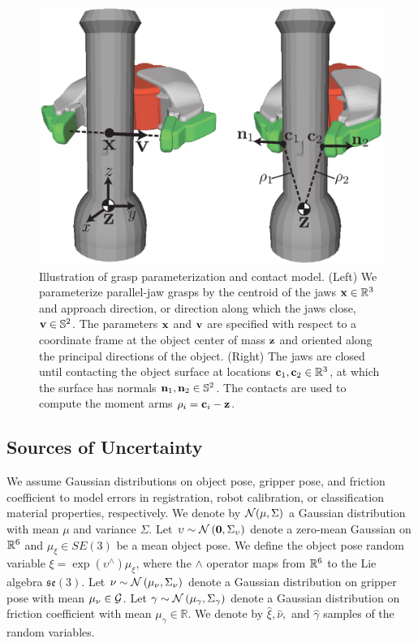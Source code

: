 \begin{figure}[t!]
\centering
\includegraphics[scale=0.44]{figures/illustrations/dexnet_grasping_model.eps}
\caption{Illustration of grasp parameterization and contact model. (Left) We parameterize parallel-jaw grasps by the centroid of the jaws $\mathbf{x} \in \mathbb{R}^3$ and approach direction, or direction along which the jaws close, $\mathbf{v} \in \mathbb{S}^2$. The parameters $\mathbf{x}$ and $\mathbf{v}$ are specified with respect to a coordinate frame at the object center of mass $\mathbf{z}$ and oriented along the principal directions of the object. (Right) The jaws are closed until contacting the object surface at locations $\mathbf{c}_1, \mathbf{c}_2 \in \mathbb{R}^3$, at which the surface has normals $\mathbf{n}_1, \mathbf{n}_2 \in \mathbb{S}^2$. The contacts are used to compute the moment arms $\rho_i = \mathbf{c}_i - \mathbf{z}$.
}
\vspace*{-15pt}
\end{figure}

\subsection{Sources of Uncertainty}
We assume Gaussian distributions on object pose, gripper pose, and friction coefficient to model errors in registration, robot calibration, or classification material properties, respectively. 
We denote by $\mathcal{N}(\mu,\Sigma)$ a Gaussian distribution with mean $\mu$ and variance $\Sigma$.
Let $\upsilon \sim \mathcal{N}\left(\mathbf{0}, \Sigma_{\upsilon}\right)$ denote a zero-mean Gaussian on $\mathbb{R}^6$ and $\mu_{\xi} \in SE(3)$ be a mean object pose.
We define the object pose random variable $\xi = \exp\left( \upsilon^{\wedge} \right) \mu_{\xi}$, where the $\wedge$ operator maps from $\mathbb{R}^6$ to the Lie algebra $\mathfrak{se}(3)$.
Let $\nu \sim \mathcal{N}\left(\mu_{\nu}, \Sigma_{\nu}\right)$ denote a Gaussian distribution on gripper pose with mean $\mu_{\nu} \in \mathcal{G}$.
Let $\gamma \sim \mathcal{N}\left(\mu_{\gamma}, \Sigma_{\gamma} \right)$ denote a Gaussian distribution on friction coefficient with mean $\mu_{\gamma} \in \mathbb{R}$.
We denote by $\hat{\xi}, \hat{\nu},$ and $\hat{\gamma}$ samples of the random variables. 

